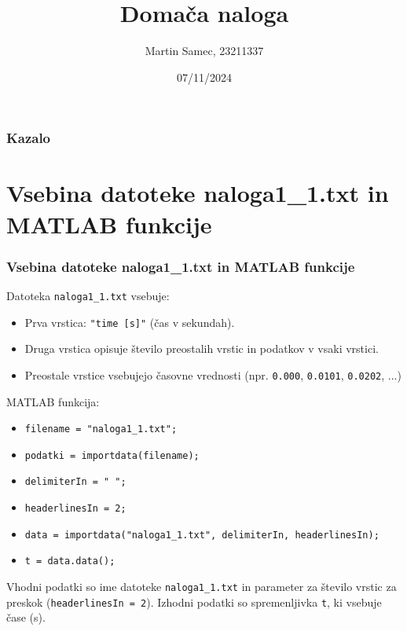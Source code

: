 \documentclass{beamer}
\title{Domača naloga}
\author{Martin Samec, 23211337}
\institute{Fakulteta za strojništvo, Univerza v Ljubljani}
\date{07/11/2024}
\begin{document}
\frame{\titlepage}

\begin{frame}
\frametitle{Kazalo}
\tableofcontents
\end{frame}

\section{Vsebina datoteke naloga1\_1.txt in MATLAB funkcije}
\begin{frame}
\frametitle{Vsebina datoteke naloga1\_1.txt in MATLAB funkcije}
Datoteka \texttt{naloga1\_1.txt} vsebuje:
\begin{itemize}
    \item Prva vrstica: \texttt{"time [s]"} (čas v sekundah).
    \item Druga vrstica opisuje število preostalih vrstic in podatkov v vsaki vrstici.
    \item Preostale vrstice vsebujejo časovne vrednosti (npr. \texttt{0.000}, \texttt{0.0101}, \texttt{0.0202}, ...)
\end{itemize}

MATLAB funkcija:
\begin{itemize}
    \item \texttt{filename = "naloga1\_1.txt";} 
    \item \texttt{podatki = importdata(filename);}
    \item \texttt{delimiterIn = " ";}
    \item \texttt{headerlinesIn = 2;}
    \item \texttt{data = importdata("naloga1\_1.txt", delimiterIn, headerlinesIn);}
    \item \texttt{t = data.data();}
\end{itemize}

Vhodni podatki so ime datoteke \texttt{naloga1\_1.txt} in parameter za število vrstic za preskok (\texttt{headerlinesIn = 2}). Izhodni podatki so spremenljivka \texttt{t}, ki vsebuje čase (s).
\end{frame}
\end{document}
